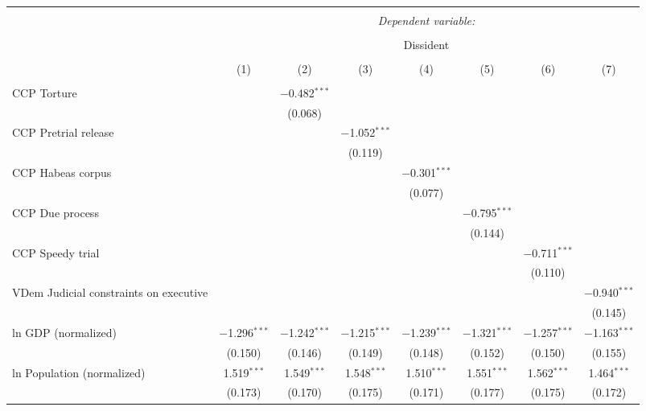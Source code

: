 
\begin{sidewaystable}[!htbp] \centering 
  \caption{} 
  \label{} 
\tiny 
\begin{tabular}{@{\extracolsep{5pt}}lccccccc} 
\\[-1.8ex]\hline 
\hline \\[-1.8ex] 
 & \multicolumn{7}{c}{\textit{Dependent variable:}} \\ 
\cline{2-8} 
\\[-1.8ex] & \multicolumn{7}{c}{Dissident} \\ 
\\[-1.8ex] & (1) & (2) & (3) & (4) & (5) & (6) & (7)\\ 
\hline \\[-1.8ex] 
 CCP Torture &  & $-$0.482$^{***}$ &  &  &  &  &  \\ 
  &  & (0.068) &  &  &  &  &  \\ 
  CCP Pretrial release &  &  & $-$1.052$^{***}$ &  &  &  &  \\ 
  &  &  & (0.119) &  &  &  &  \\ 
  CCP Habeas corpus &  &  &  & $-$0.301$^{***}$ &  &  &  \\ 
  &  &  &  & (0.077) &  &  &  \\ 
  CCP Due process &  &  &  &  & $-$0.795$^{***}$ &  &  \\ 
  &  &  &  &  & (0.144) &  &  \\ 
  CCP Speedy trial &  &  &  &  &  & $-$0.711$^{***}$ &  \\ 
  &  &  &  &  &  & (0.110) &  \\ 
  VDem Judicial constraints on executive &  &  &  &  &  &  & $-$0.940$^{***}$ \\ 
  &  &  &  &  &  &  & (0.145) \\ 
  ln GDP (normalized) & $-$1.296$^{***}$ & $-$1.242$^{***}$ & $-$1.215$^{***}$ & $-$1.239$^{***}$ & $-$1.321$^{***}$ & $-$1.257$^{***}$ & $-$1.163$^{***}$ \\ 
  & (0.150) & (0.146) & (0.149) & (0.148) & (0.152) & (0.150) & (0.155) \\ 
  ln Population (normalized) & 1.519$^{***}$ & 1.549$^{***}$ & 1.548$^{***}$ & 1.510$^{***}$ & 1.551$^{***}$ & 1.562$^{***}$ & 1.464$^{***}$ \\ 
  & (0.173) & (0.170) & (0.175) & (0.171) & (0.177) & (0.175) & (0.172) \\ 

\end{tabular}
\end{sidewaystable}
